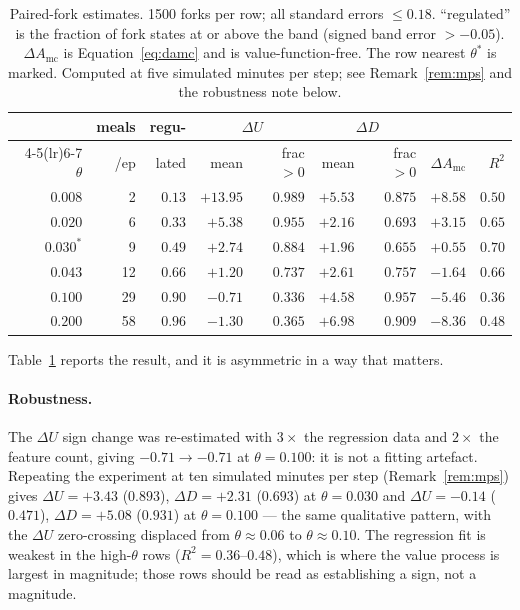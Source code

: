 \documentclass[11pt]{article}
\theoremstyle{definition}
\begin{document}
\begin{table}[t]
\centering
\caption{Paired-fork estimates. 1500 forks per row; all standard errors
$\le0.18$. ``regulated'' is the fraction of fork states at or above the band
(signed band error $>-0.05$). $\Delta A_{\mathrm{mc}}$ is
Equation~\eqref{eq:damc} and is value-function-free. The row nearest
$\theta^\ast$ is marked. Computed at five simulated minutes per step; see
Remark~\ref{rem:mps} and the robustness note below.}
\label{tab:fork}
\begin{tabular}{rrrrrrrrr}
\toprule
& meals & regu- & \multicolumn{2}{c}{$\Delta U$} & \multicolumn{2}{c}{$\Delta D$} & & \\
\cmidrule(lr){4-5}\cmidrule(lr){6-7}
$\theta$ & /ep & lated & mean & frac${>}0$ & mean & frac${>}0$ & $\Delta A_{\mathrm{mc}}$ & $R^2$\\
\midrule
$0.008$ & 2  & $0.13$ & $+13.95$ & $0.989$ & $+5.53$ & $0.875$ & $+8.58$ & $0.50$\\
$0.020$ & 6  & $0.33$ & $+5.38$  & $0.955$ & $+2.16$ & $0.693$ & $+3.15$ & $0.65$\\
$0.030^{\ast}$ & 9  & $0.49$ & $+2.74$  & $0.884$ & $+1.96$ & $0.655$ & $+0.55$ & $0.70$\\
$0.043$ & 12 & $0.66$ & $+1.20$  & $0.737$ & $+2.61$ & $0.757$ & $-1.64$ & $0.66$\\
$0.100$ & 29 & $0.90$ & $-0.71$  & $0.336$ & $+4.58$ & $0.957$ & $-5.46$ & $0.36$\\
$0.200$ & 58 & $0.96$ & $-1.30$  & $0.365$ & $+6.98$ & $0.909$ & $-8.36$ & $0.48$\\
\bottomrule
\end{tabular}
\end{table}

Table~\ref{tab:fork} reports the result, and it is asymmetric in a way that
matters.

\paragraph{Robustness.} The $\Delta U$ sign change was re-estimated with
$3\times$ the regression data and $2\times$ the feature count, giving
$-0.71\to-0.71$ at $\theta=0.100$: it is not a fitting artefact. Repeating the
experiment at ten simulated minutes per step (Remark~\ref{rem:mps}) gives
$\Delta U=+3.43$ ($0.893$), $\Delta D=+2.31$ ($0.693$) at $\theta=0.030$ and
$\Delta U=-0.14$ ($0.471$), $\Delta D=+5.08$ ($0.931$) at $\theta=0.100$ ---
the same qualitative pattern, with the $\Delta U$ zero-crossing displaced from
$\theta\approx0.06$ to $\theta\approx0.10$. The regression fit is weakest in
the high-$\theta$ rows ($R^2=0.36$--$0.48$), which is where the value process
is largest in magnitude; those rows should be read as establishing a sign, not
a magnitude.
\end{document}
